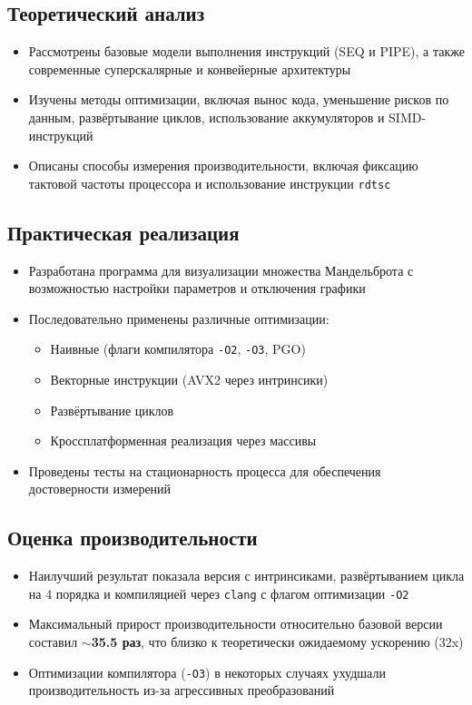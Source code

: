 \documentclass[12pt,a4paper]{article}
\begin{document}
\subsection{Теоретический анализ}
\begin{itemize}
    \item Рассмотрены базовые модели выполнения инструкций (SEQ и PIPE), а также современные суперскалярные и конвейерные архитектуры
    \item Изучены методы оптимизации, включая вынос кода, уменьшение рисков по данным, развёртывание циклов, использование аккумуляторов и SIMD-инструкций
    \item Описаны способы измерения производительности, включая фиксацию тактовой частоты процессора и использование инструкции \texttt{rdtsc}
\end{itemize}

\subsection{Практическая реализация}
\begin{itemize}
    \item Разработана программа для визуализации множества Мандельброта с возможностью настройки параметров и отключения графики
    \item Последовательно применены различные оптимизации:
    \begin{itemize}
        \item Наивные (флаги компилятора \texttt{-O2}, \texttt{-O3}, PGO)
        \item Векторные инструкции (AVX2 через интринсики)
        \item Развёртывание циклов
        \item Кроссплатформенная реализация через массивы
    \end{itemize}
    \item Проведены тесты на стационарность процесса для обеспечения достоверности измерений
\end{itemize}

\subsection{Оценка производительности}
\begin{itemize}
    \item Наилучший результат показала версия с интринсиками, развёртыванием цикла на 4 порядка и компиляцией через \texttt{clang} с флагом оптимизации \texttt{-O2}
    \item Максимальный прирост производительности относительно базовой версии составил \textbf{$\sim$35.5 раз}, что близко к теоретически ожидаемому ускорению (32x)
    \item Оптимизации компилятора (\texttt{-O3}) в некоторых случаях ухудшали производительность из-за агрессивных преобразований
\end{itemize}
\end{document}
